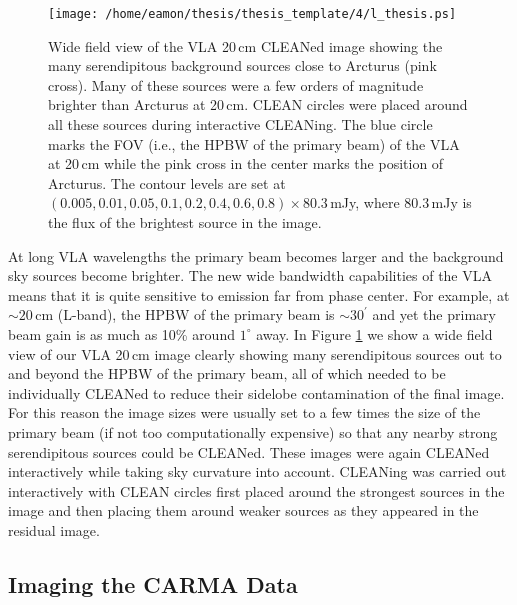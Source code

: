 \begin{figure}[hbt!]
\centering 
\texttt{[image: /home/eamon/thesis/thesis\_template/4/l\_thesis.ps]}  
\caption[Wide field view of the VLA 20\,cm image.]{Wide field view of the VLA 20\,cm CLEANed image showing the many serendipitous background sources close to Arcturus (pink cross). Many of these sources were a few orders of magnitude brighter than Arcturus at 20\,cm. CLEAN circles were placed around all these sources during interactive CLEANing. The blue circle marks the FOV (i.e., the HPBW of the primary beam) of the VLA at 20\,cm while the pink cross in the center marks the position of Arcturus. The contour levels are set at $(0.005,0.01,0.05,0.1,0.2,0.4,0.6,0.8)\times 80.3$\,mJy, where $80.3$\,mJy is the flux of the brightest source in the image.}
\label{fig:4.8}
\end{figure}

At long VLA wavelengths the primary beam becomes larger and the background sky sources become brighter. The new wide bandwidth capabilities of the VLA means that it is quite sensitive to emission far from phase center. For example, at $\sim 20$\,cm (L-band), the HPBW of the primary beam is $\sim 30^{\prime}$ and yet the primary beam gain is as much as 10\% around $1^{\circ}$ away. In Figure \ref{fig:4.8} we show a wide field view of our VLA 20\,cm image clearly showing many serendipitous sources out to and beyond the HPBW of the primary beam, all of which needed to be individually CLEANed to reduce their sidelobe contamination of the final image. For this reason the image sizes were usually set to a few times the size of the primary beam (if not too computationally expensive) so that any nearby strong serendipitous sources could be CLEANed. These images were again CLEANed interactively while taking sky curvature into account. CLEANing was carried out interactively with CLEAN circles first placed around the strongest sources in the image and then placing them around weaker sources as they appeared in the residual image. 
 
\subsection{Imaging the CARMA Data}\label{sec:4.3.2}

